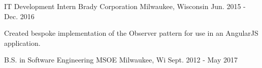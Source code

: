 \begin{cventries}
  \cventry
    {IT Development Intern} %
    {Brady Corporation} %
    {Milwaukee, Wisconsin} %
    {Jun. 2015 - Dec. 2016} %
    {
      \begin{cvitems} %
        \item {Created bespoke implementation of the Observer pattern for use in an AngularJS application.}
      \end{cvitems}
    }

  \cventry
    {B.S. in Software Engineering} %
    {MSOE} %
    {Milwaukee, Wi} %
    {Sept. 2012 - May 2017} %
    {
    }

\end{cventries}

